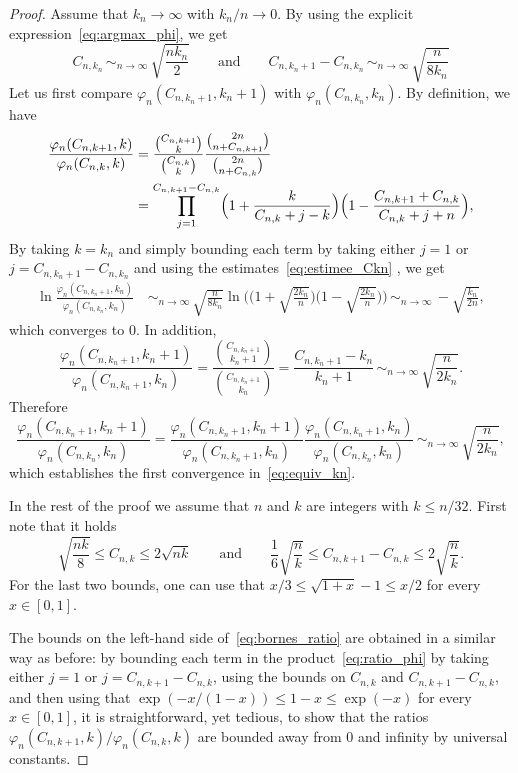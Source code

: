 \documentclass[10pt]{amsart}
\theoremstyle{plain}
\theoremstyle{definition}
\theoremstyle{remark}
\newcommand{\equi}[1][n]{\,\mathop{\sim}^{}_{#1 \to \infty}\,}
\begin{document}
\begin{proof}
Assume that $k_n\to\infty$ with $k_n/n\to0$. By using the explicit expression~\eqref{eq:argmax_phi}, we get
\begin{equation}\label{eq:estimee_Ckn}
C_{n,k_n} \equi \sqrt{\frac{n k_n}{2}}
\qquad\text{and}\qquad
C_{n,k_n+1} - C_{n,k_n} \equi \sqrt{\frac{n}{8 k_n }}
\end{equation}
Let us first compare $\varphi_{n}(C_{n,k_{n}+1},k_{n}+1)$ with $\varphi_{n}(C_{n,k_{n}},k_{n})$. By definition, we have
\begin{equation}\label{eq:ratio_phi}
\begin{split}
\frac{\varphi_{n}(C_{n,k+1},k)}{\varphi_{n}(C_{n,k},k)}
&= \frac{\binom{C_{n,k+1}}{k}}{\binom{C_{n,k}}{k}} \frac{\binom{2n}{n+C_{n,k+1}}}{\binom{2n}{n+C_{n,k}}}\\
&= \prod_{j=1}^{C_{n,k+1}-C_{n,k}} \Bigl(1+\frac{k}{C_{n,k}+j-k} \Bigr) \Bigl(1- \frac{C_{n,k+1}+C_{n,k}}{C_{n,k}+j+n}\Bigr),
\end{split}
\end{equation}
By taking $k=k_{n}$ and simply bounding each term by taking either $j=1$ or $j=C_{n,k_{n}+1}-C_{n,k_{n}}$ and using the estimates~\eqref{eq:estimee_Ckn} , we get
\begin{align*}
\ln \frac{\varphi_{n}(C_{n,k_n+1},k_n)}{\varphi_{n}(C_{n,k_n},k_n)}
&\equi \sqrt{\frac{n}{8k_n}} \ln\biggl(\biggl(1+\sqrt{\frac{2k_n}{n}}\biggr) \biggl(1-\sqrt{\frac{2k_n}{n}}\biggr)\biggr)
\equi - \sqrt{\frac{k_n}{2n}},
\end{align*}
which converges to $0$. In addition,
\[
\frac{\varphi_{n}(C_{n,k_n+1},k_n+1)}{\varphi_{n}(C_{n,k_n+1},k_n)}
= \frac{\binom{C_{n,k_n+1}}{k_n+1}}{\binom{C_{n,k_n+1}}{k_n}}
= \frac{C_{n,k_n+1} - k_n}{k_n+1}
\equi \sqrt{\frac{n}{2k_n}}.
\]
Therefore
\[
\frac{\varphi_{n}(C_{n,k_n+1},k_n+1)}{\varphi_{n}(C_{n,k_n},k_n)}
= \frac{\varphi_{n}(C_{n,k_n+1},k_n+1)}{\varphi_{n}(C_{n,k_n+1},k_n)} \frac{\varphi_{n}(C_{n,k_n+1},k_n)}{\varphi_{n}(C_{n,k_n},k_n)}
\equi \sqrt{\frac{n}{2k_n}},
\]
which establishes the first convergence in~\eqref{eq:equiv_kn}.

In the rest of the proof we assume that $n$ and $k$ are integers with $k \le n/32$. First note that it holds
\[
\sqrt{\frac{n k}{8}}
\le C_{n,k}
\le 2 \sqrt{n k}
\qquad\text{and}\qquad
\frac{1}{6} \sqrt{\frac{n}{k}} \le C_{n,k+1} - C_{n,k} \le 2 \sqrt{\frac{n}{k}}.
\]
For the last two bounds, one can use that $x/3 \le \sqrt{1+x} - 1 \le x/2$ for every $x \in[0,1]$.

The bounds on the left-hand side of~\eqref{eq:bornes_ratio} are obtained in a similar way as before: by bounding each term in the product~\eqref{eq:ratio_phi} by taking either $j=1$ or $j=C_{n,k+1}-C_{n,k}$, using the bounds on $C_{n,k}$ and $C_{n,k+1}-C_{n,k}$, and then using that $\exp(-x/(1-x)) \le 1-x \le \exp(-x)$ for every $x \in [0,1]$, it is straightforward, yet tedious, to show that the ratios
$\varphi_{n}(C_{n,k+1},k)/\varphi_{n}(C_{n,k},k)$
are bounded away from $0$ and infinity by universal constants.


\end{proof}
\end{document}

